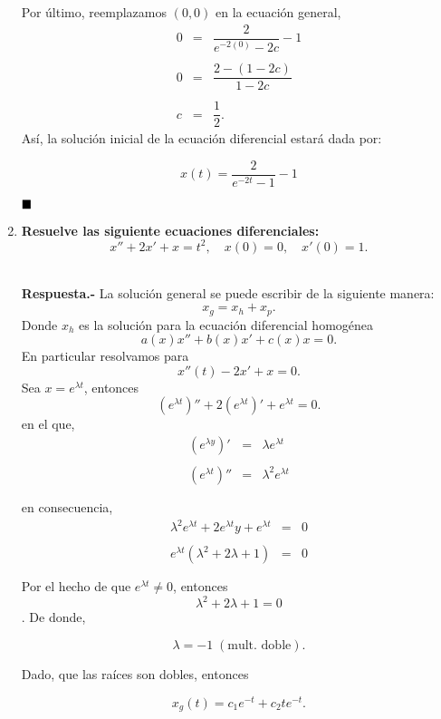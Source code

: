 \begin{enumerate}
\begin{multicols}{2}
	Por último, reemplazamos $(0,0)$ en la ecuación general,
	$$
	\begin{array}{rcl}
	    0&=&\dfrac{2}{e^{-2(0)}-2c}-1\\\\
	    0&=&\dfrac{2-(1-2c)}{1-2c}\\\\
	    c&=&\dfrac{1}{2}.
    \end{array}
	$$
	Así, la solución inicial de la ecuación diferencial estará dada por:
	\begin{tcolorbox}
	    $$x(t) = \dfrac{2}{e^{-2t}-1}-1$$
	\end{tcolorbox}
	$\hfill\blacksquare$
	\end{multicols}
	\vspace{.5cm}

    \item \textbf{\boldmath Resuelve las siguiente ecuaciones diferenciales:
	$$x''+2x'+x=t^2,\quad x(0)=0,\quad x'(0)=1.$$}\\
    \begin{multicols}{2}
    	\textbf{Respuesta.-}\; La solución general se puede escribir de la siguiente manera:
	$$x_g=x_h+x_p.$$
	Donde $x_h$ es la solución para la ecuación diferencial homogénea 
	$$a(x)x''+b(x)x'+c(x)x=0.$$
	En particular resolvamos para 
	$$x''(t)-2x'+x=0.$$
	Sea $x=e^{\lambda t}$, entonces
	$$\left(e^{\lambda t}\right)''+2\left(e^{\lambda t}\right)'+e^{\lambda t}=0.$$
	en el que,
	$$
	\begin{array}{rcl}
	    \left(e^{\lambda y}\right)' &=& \lambda e^{\lambda t}\\\\
	    \left(e^{\lambda t}\right)'' &=& \lambda^2e^{\lambda t}\\\\
	\end{array}
	$$
	en consecuencia,
	$$
	\begin{array}{rcl}
	    \lambda^2e^{\lambda t}+2e^{\lambda t}y+e^{\lambda t}&=&0\\\\
	    e^{\lambda t}\left(\lambda^2+2\lambda +1\right)&=&0\\\\
	\end{array}
	$$
	Por el hecho de que $e^{\lambda t}\neq 0$, entonces 
	$$\lambda^2+2\lambda +1=0$$.
	De donde, 
	\begin{tcolorbox}
	    $$\lambda=-1 \; (\mbox{mult. doble}).$$
	\end{tcolorbox}
	Dado, que las raíces son dobles, entonces
	\begin{tcolorbox}
	    $$x_g(t)=c_1e^{-t}+c_2te^{-t}.$$
	\end{tcolorbox}


\end{multicols}
\end{enumerate}
